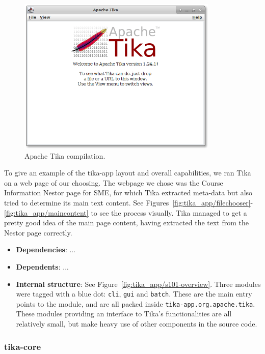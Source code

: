 \documentclass{article}
\begin{document}
\begin{figure}[ht]
    \centering
    \includegraphics[width=0.85\textwidth]{report/images/tika_app/tika_app-main.png}
    \caption{Apache Tika compilation.}
    \label{fig:tika_app/main}
\end{figure}

To give an example of the tika-app layout and overall capabilities, we ran Tika on a web page of our choosing. The webpage we chose was the Course Information Nestor page for SME, for which Tika extracted meta-data but also tried to determine its main text content. See Figures~\ref{fig:tika_app/filechooser}-\ref{fig:tika_app/maincontent} to see the process visually. Tika managed to get a pretty good idea of the main page content, having extracted the text from the Nestor page correctly.

\begin{itemize}
    \item \textbf{Dependencies}: ...
    \item \textbf{Dependents}: ...
    \item \textbf{Internal structure}: See Figure~\ref{fig:tika_app/s101-overview}. Three modules were tagged with a blue dot: \texttt{cli}, \texttt{gui} and \texttt{batch}. These are the main entry points to the module, and are all packed inside \texttt{tika-app.org.apache.tika}. These modules providing an interface to Tika's functionalities are all relatively small, but make heavy use of other components in the source code.
\end{itemize}

\subsubsection{tika-core}
\end{document}
